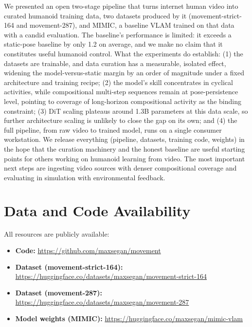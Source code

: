 \documentclass[letterpaper, 10pt, conference]{ieeeconf}
\begin{document}
We presented an open two-stage pipeline that turns internet human video into curated humanoid training data, two datasets produced by it (movement-strict-164 and movement-287), and MIMIC, a baseline VLAM trained on that data with a candid evaluation. The baseline's performance is limited: it exceeds a static-pose baseline by only 1.2\textdegree{} on average, and we make no claim that it constitutes useful humanoid control. What the experiments do establish: (1) the datasets are trainable, and data curation has a measurable, isolated effect, widening the model-versus-static margin by an order of magnitude under a fixed architecture and training recipe; (2) the model's skill concentrates in cyclical activities, while compositional multi-step sequences remain at pose-persistence level, pointing to coverage of long-horizon compositional activity as the binding constraint; (3) DiT scaling plateaus around 1.3B parameters at this data scale, so further architecture scaling is unlikely to close the gap on its own; and (4) the full pipeline, from raw video to trained model, runs on a single consumer workstation. We release everything (pipeline, datasets, training code, weights) in the hope that the curation machinery and the honest baseline are useful starting points for others working on humanoid learning from video. The most important next steps are ingesting video sources with denser compositional coverage and evaluating in simulation with environmental feedback.

\section*{Data and Code Availability}

All resources are publicly available:
\begin{itemize}
    \item \textbf{Code:} \url{https://github.com/maxsegan/movement}
    \item \textbf{Dataset (movement-strict-164):} \url{https://huggingface.co/datasets/maxsegan/movement-strict-164}
    \item \textbf{Dataset (movement-287):} \url{https://huggingface.co/datasets/maxsegan/movement-287}
    \item \textbf{Model weights (MIMIC):} \url{https://huggingface.co/maxsegan/mimic-vlam}
\end{itemize}
\end{document}

